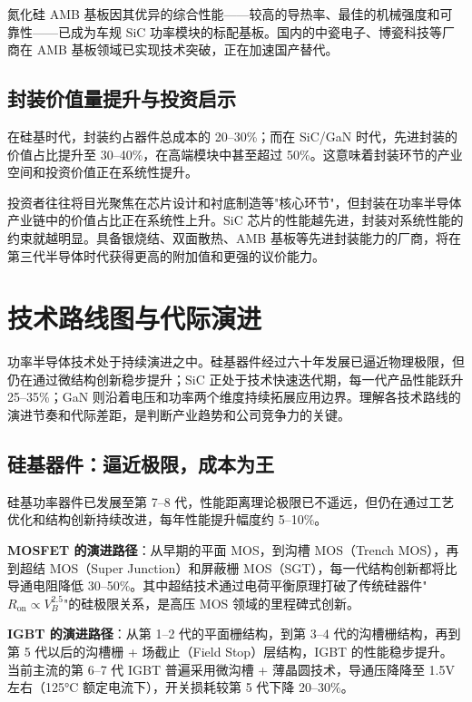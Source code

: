 氮化硅 AMB 基板因其优异的综合性能——较高的导热率、最佳的机械强度和可靠性——已成为车规 SiC 功率模块的标配基板。国内的中瓷电子、博瓷科技等厂商在 AMB 基板领域已实现技术突破，正在加速国产替代。

\subsection{封装价值量提升与投资启示}

在硅基时代，封装约占器件总成本的 20–30\%；而在 SiC/GaN 时代，先进封装的价值占比提升至 30–40\%，在高端模块中甚至超过 50\%。这意味着封装环节的产业空间和投资价值正在系统性提升。

\begin{keyinsight}[封装：被低估的价值环节]
投资者往往将目光聚焦在芯片设计和衬底制造等"核心环节"，但封装在功率半导体产业链中的价值占比正在系统性上升。SiC 芯片的性能越先进，封装对系统性能的约束就越明显。具备银烧结、双面散热、AMB 基板等先进封装能力的厂商，将在第三代半导体时代获得更高的附加值和更强的议价能力。
\end{keyinsight}

\section{技术路线图与代际演进}

功率半导体技术处于持续演进之中。硅基器件经过六十年发展已逼近物理极限，但仍在通过微结构创新稳步提升；SiC 正处于技术快速迭代期，每一代产品性能跃升 25–35\%；GaN 则沿着电压和功率两个维度持续拓展应用边界。理解各技术路线的演进节奏和代际差距，是判断产业趋势和公司竞争力的关键。

\subsection{硅基器件：逼近极限，成本为王}

硅基功率器件已发展至第 7–8 代，性能距离理论极限已不遥远，但仍在通过工艺优化和结构创新持续改进，每年性能提升幅度约 5–10\%。

\textbf{MOSFET 的演进路径}：从早期的平面 MOS，到沟槽 MOS（Trench MOS），再到超结 MOS（Super Junction）和屏蔽栅 MOS（SGT），每一代结构创新都将比导通电阻降低 30–50\%。其中超结技术通过电荷平衡原理打破了传统硅器件"$R_{\text{on}} \propto V_B^{2.5}$"的硅极限关系，是高压 MOS 领域的里程碑式创新。

\textbf{IGBT 的演进路径}：从第 1–2 代的平面栅结构，到第 3–4 代的沟槽栅结构，再到第 5 代以后的沟槽栅 + 场截止（Field Stop）层结构，IGBT 的性能稳步提升。当前主流的第 6–7 代 IGBT 普遍采用微沟槽 + 薄晶圆技术，导通压降降至 1.5V 左右（125°C 额定电流下），开关损耗较第 5 代下降 20–30\%。

